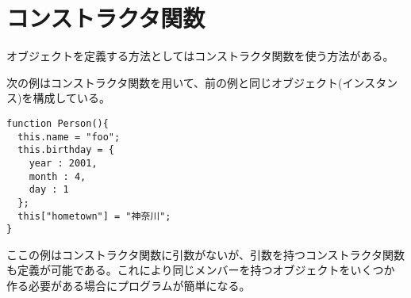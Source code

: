 \section{コンストラクタ関数}
オブジェクトを定義する方法としてはコンストラクタ関数を使う方法がある。
\begin{Exec}\label{constructor}\upshape
次の例はコンストラクタ関数を用いて、前の例と同じオブジェクト(インスタン
 ス)を構成している。
\begin{Verbatim}
function Person(){
  this.name = "foo";
  this.birthday = {
    year : 2001,
    month : 4,
    day : 1
  };
  this["hometown"] = "神奈川";
}
\end{Verbatim}
\end{Exec}
ここの例はコンストラクタ関数に引数がないが、引数を持つコンストラクタ関数
 も定義が可能である。これにより同じメンバーを持つオブジェクトをいくつか
 作る必要がある場合にプログラムが簡単になる。

